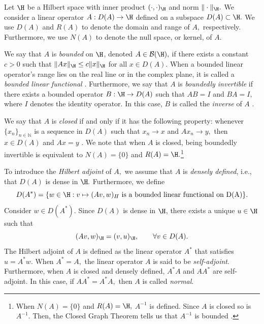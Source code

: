 Let $\H$ be a Hilbert space with inner product $(\cdot, \cdot)_{\H}$ and norm $\|\cdot \|_{\H}.$
We consider a linear operator $A : D(A) \rightarrow \H$ defined on a subspace $D(A) \subset \H.$ We use $D(A)$ and $R(A)$ to denote the domain and range of $A,$ respectively. Furthermore, we use $N(A)$ to denote the null space, or kernel, of $A.$   

We say that $A$ is \textit{bounded} on $\H$, denoted $A \in \mathcal{B}(\H),$ if there exists a constant $c>0$ such that $\|Ax\|_{\H} \le c \|x\|_{\H}$ for all $x \in D(A).$ When a bounded linear operator's range lies on the real line or in the complex plane, it is called a \textit{bounded linear functional} \cite{krey}. 
Furthermore, we say that $A$ is \textit{boundedly invertible} if there exists a bounded operator $B:\H \rightarrow D(A)$ such that $AB=I$ and $BA = I,$ where $I$ denotes the identity operator. In this case, $B$ is called the \textit{inverse} of $A$ \cite{Matt}. 


We say that $A$ is \textit{closed} if and only if it has the following property: whenever $\{x_n\}_{n \in \mathbb{N}}$ is a sequence in $D(A)$ such that $x_n \rightarrow x$ and $A x_n \rightarrow y,$ then $x \in D(A)$ and $Ax=y$ \cite{krey}.
We note that when $A$ is closed, being boundedly invertible is equivalent to $N(A) = \{0\}$ and $R(A) = \H.$\footnote{When $N(A) =\{0\}$ and $R(A) = \H,$ $A^{-1}$ is defined. Since $A$ is closed so is $A^{-1}.$ Then, the Closed Graph Theorem tells us that $A^{-1}$ is bounded \cite{krey}.} 

 To introduce the \textit{Hilbert adjoint} of $A,$ we assume that $A$ is \textit{densely defined}, i.e., that $D(A)$ is dense in $\H.$ Furthermore, we define
\begin{equation}\label{D(A*)}
    D(A^*) = \{ w \in \H : v \mapsto ( Av, w )_{H} \text{ is a bounded linear functional on D(A)}\}.
 \end{equation}
 Consider $w \in D(A^*).$ Since $D(A)$ is dense in $\H$, there exists a unique $u \in \H$ such that 
 \begin{equation}
     (Av, w)_{\H} = (v, u)_{\H}, \qquad \forall v \in D(A).
 \end{equation}
 The Hilbert adjoint of $A$ is defined as the linear operator $A^*$ that satisfies $u = A^*w.$ When $A^* = A,$ the linear operator $A$ is said to be \textit{self-adjoint}. Furthermore, when $A$ is closed and densely defined, $A^*A$ and $AA^*$ are self-adjoint. In this case, if $AA^* = A^*A,$ then $A$ is called \textit{normal}.



